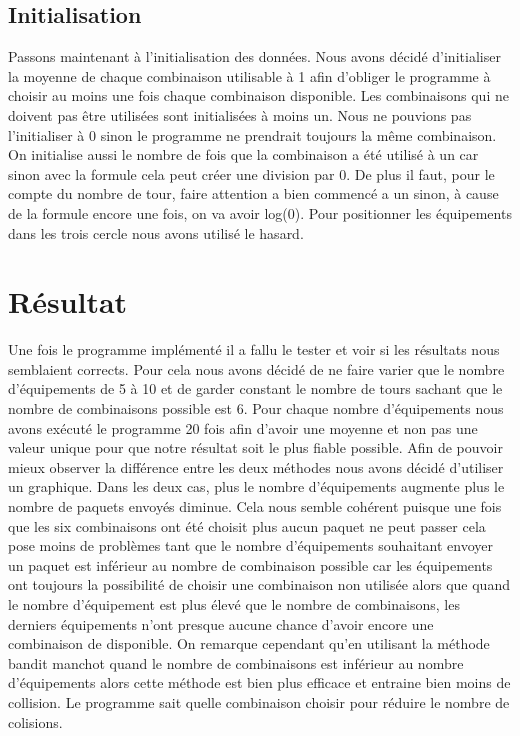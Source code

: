 \documentclass[12pt,a4paper]{article}
\begin{document}
\subsection{Initialisation}
\label{sub.exp.struct}
Passons maintenant à l'initialisation des données. Nous avons décidé 
d'initialiser la moyenne de chaque combinaison utilisable à 1 afin d'obliger le 
programme à choisir au moins une fois chaque combinaison disponible. 
Les combinaisons qui ne doivent pas être utilisées sont initialisées à moins 
un. Nous ne pouvions pas l'initialiser à 0 sinon le programme ne prendrait 
toujours la même combinaison. On initialise aussi le nombre de fois que 
la combinaison a été utilisé à un car sinon avec la formule cela peut créer 
une division par 0. De plus il faut, pour le compte du nombre de tour, faire 
attention a bien commencé a un sinon, à cause de la formule encore une fois, 
on va avoir log(0). Pour positionner les équipements dans les trois cercle nous 
avons utilisé le hasard. 

\section{Résultat}
\label{sec.res}
Une fois le programme implémenté il a fallu le tester et voir si les résultats
nous semblaient corrects. Pour cela nous avons décidé de ne faire varier 
que le nombre d'équipements de 5 à 10 et de garder constant le nombre de tours 
sachant que le nombre de combinaisons possible est 6.
Pour chaque nombre d'équipements nous avons exécuté le programme 20 fois afin 
d'avoir une moyenne et non pas une valeur unique pour que notre résultat soit
le plus fiable possible.
\newline
Afin de pouvoir mieux observer la différence entre les deux méthodes nous 
avons décidé d'utiliser un graphique.
\newline Dans les deux cas, plus le nombre 
d'équipements augmente plus le nombre de paquets envoyés diminue. Cela nous 
semble cohérent puisque une fois que les six combinaisons ont été choisit 
plus aucun paquet ne peut passer cela pose moins de problèmes tant que le nombre
d'équipements souhaitant envoyer un paquet est inférieur au nombre de 
combinaison possible car les équipements ont toujours la possibilité de 
choisir une combinaison non utilisée alors que quand le nombre d'équipement 
est plus élevé que le nombre de combinaisons, les derniers équipements n'ont 
presque aucune chance d'avoir encore une combinaison de disponible.
\newline On remarque cependant qu'en utilisant la méthode bandit manchot 
quand le nombre de combinaisons est inférieur au nombre d'équipements alors 
cette méthode est bien plus efficace et entraine bien moins de collision. Le 
programme sait quelle combinaison choisir pour réduire le nombre de colisions.
\end{document}
